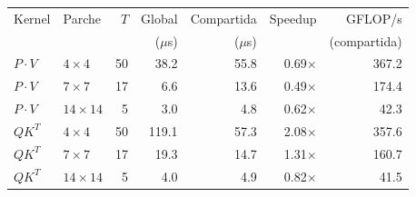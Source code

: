 \begin{tabular}{llrrrrr}
\toprule
Kernel & Parche & $T$ & Global & Compartida & Speedup & GFLOP/s \\
 & & & ($\mu$s) & ($\mu$s) & & (compartida) \\
\midrule
$P \cdot V$ & $4\times4$ & 50 & 38.2 & 55.8 & 0.69$\times$ & 367.2 \\
$P \cdot V$ & $7\times7$ & 17 & 6.6 & 13.6 & 0.49$\times$ & 174.4 \\
$P \cdot V$ & $14\times14$ & 5 & 3.0 & 4.8 & 0.62$\times$ & 42.3 \\
$QK^{T}$ & $4\times4$ & 50 & 119.1 & 57.3 & 2.08$\times$ & 357.6 \\
$QK^{T}$ & $7\times7$ & 17 & 19.3 & 14.7 & 1.31$\times$ & 160.7 \\
$QK^{T}$ & $14\times14$ & 5 & 4.0 & 4.9 & 0.82$\times$ & 41.5 \\
\bottomrule
\end{tabular}
